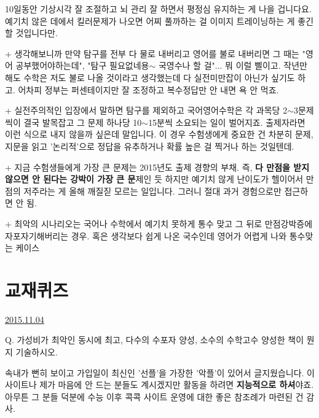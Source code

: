 10일동안 기상시각 잘 조절하고 뇌 관리 잘 하면서 평정심 유지하는 게 나을 겁니다요.
예기치 않은 데에서 킬러문제가 나오면 어찌 풀까하는 걸 이미지 트레이닝하는 게 좋긴 할 것입니다만.
\vspace{5mm}

+ 생각해보니까 만약 탐구를 전부 다 물로 내버리고 영어를 불로 내버리면
그 때는 "영어 공부했어야하는데", "탐구 필요없네용$\sim$ 국영수나 할 걸"... 뭐 이럴 삘이고.
작년만 해도 수학은 저도 불로 나올 것이라고 생각했는데 다 실전미만잡이 아닌가 싶기도 하고.
어차피 정부는 퍼센테이지만 잘 조정하고 복수정답만 안 내면 욕 안 먹죠.
\vspace{5mm}

+ 실전주의적인 입장에서 말하면 탐구를 제외하고 국어영어수학은 각 과목당 2$\sim$3문제씩이 결국 발목잡고
그 문제 하나당 10$\sim$15분씩 소요되는 일이 벌어지죠. 출제자라면 이런 식으로 내지 않을까 싶은데 말입니다.
이 경우 수험생에게 중요한 건 차분히 문제, 지문을 읽고 '논리적'으로 정답을 유추하거나 확률 높은 걸 찍거나 하는 것일텐데.
\vspace{5mm}

+ 지금 수험생들에게 가장 큰 문제는 2015년도 출제 경향의 부채. 즉, \textbf{다 만점을 받지 않으면 안 된다는 강박이 가장 큰 문}제인 듯
하지만 예기치 않게 난이도가 헬이어서 만점의 저주라는 게 올해 깨질짇 모르는 일입니다. 그러니 절대 과거 경험으로만 접근하면 안 됨.
\vspace{5mm}

+ 최악의 시나리오는 국어나 수학에서 예기치 못하게 통수 맞고 그 뒤로 만점강박증에 자포자기해버리는 경우.
혹은 생각보다 쉽게 나온 국수인데 영어가 어렵게 나와 통수맞는 케이스
\vspace{5mm}






\section{교재퀴즈}
\href{https://www.kockoc.com/Apoc/462586}{2015.11.04}

\vspace{5mm}

Q. 가성비가 최악인 동시에 최고,  다수의 수포자 양성, 소수의 수학고수 양성한 책이 뭔지 기술하시오.
\vspace{5mm}

속내가 뻔히 보이고 가입일이 최신인 '선플'을 가장한 '악플'이 있어서 글지웠습니다.
이 사이트나 제가 마음에 안 드는 분들도 계시겠지만 활동을 하려면 \textbf{지능적으로 하셔}야죠.
아무튼 그 분들 덕분에 수능 이후 콕콕 사이트 운영에 대한 좋은 참조례가 마련된 건 감사.
\vspace{5mm}

